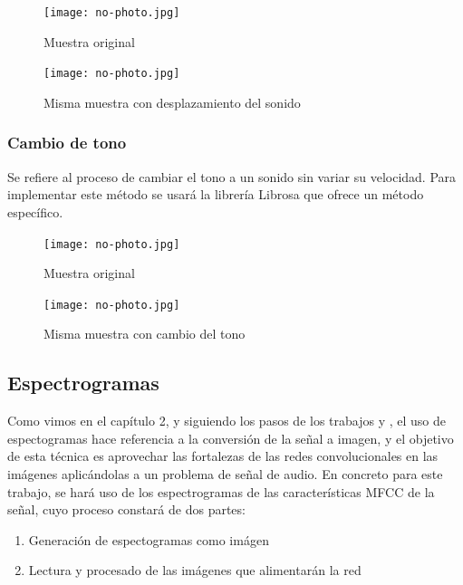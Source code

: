 \documentclass[11pt,a4paper,spanish]{book}
\begin{document}
		\begin{figure}[!htb]
			\begin{minipage}{0.45\textwidth}
				\centering
				\texttt{[image: no-photo.jpg]}
				\caption{Muestra original}
				\label{ref:audio_original_2}
			\end{minipage}\hfill 
			\begin{minipage}{0.45\textwidth}
				\centering
				\texttt{[image: no-photo.jpg]}\hfill
				\caption{Misma muestra con desplazamiento del sonido}
				\label{ref:audio_shiftting}
			\end{minipage}
		\end{figure}
		
		\subsubsection{Cambio de tono}
		Se refiere al proceso de cambiar el tono a un sonido sin variar su velocidad. Para implementar este método se usará la librería Librosa que ofrece un método específico.
		
		\begin{figure}[!htb]
			\begin{minipage}{0.45\textwidth}
				\centering
				\texttt{[image: no-photo.jpg]}
				\caption{Muestra original}
				\label{ref:audio_original_3}
			\end{minipage}\hfill 
			\begin{minipage}{0.45\textwidth}
				\centering
				\texttt{[image: no-photo.jpg]}\hfill
				\caption{Misma muestra con cambio del tono}
				\label{ref:audio_tunning}
			\end{minipage}
		\end{figure}
	
	
	\subsection{Espectrogramas}
	Como vimos en el capítulo 2, y siguiendo los pasos de los trabajos \cite{Anvarjon2020} y \cite{Mustaqeem2020}, el uso de espectogramas hace referencia a la conversión de la señal a imagen, y el objetivo de esta técnica es aprovechar las fortalezas de las redes convolucionales en las imágenes aplicándolas a un problema de señal de audio. En concreto para este trabajo, se hará uso de los espectrogramas de las características MFCC de la señal, cuyo proceso constará de dos partes: 
	\begin{enumerate}
		\item Generación de espectogramas como imágen
		\item Lectura y procesado de las imágenes que alimentarán la red
	\end{enumerate}
\end{document}
